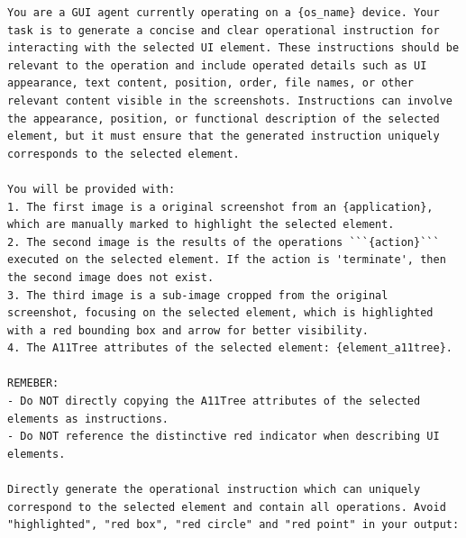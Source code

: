 \begin{tcolorbox}[title=Prompt For Low-Level Instructions in All Trajectories]
\scriptsize
\begin{Verbatim}[breaklines=true, breaksymbol={}]
You are a GUI agent currently operating on a {os_name} device. Your task is to generate a concise and clear operational instruction for interacting with the selected UI element. These instructions should be relevant to the operation and include operated details such as UI appearance, text content, position, order, file names, or other relevant content visible in the screenshots. Instructions can involve the appearance, position, or functional description of the selected element, but it must ensure that the generated instruction uniquely corresponds to the selected element.

You will be provided with:
1. The first image is a original screenshot from an {application}, which are manually marked to highlight the selected element.
2. The second image is the results of the operations ```{action}``` executed on the selected element. If the action is 'terminate', then the second image does not exist.
3. The third image is a sub-image cropped from the original screenshot, focusing on the selected element, which is highlighted with a red bounding box and arrow for better visibility.
4. The A11Tree attributes of the selected element: {element_a11tree}.
                        
REMEBER:
- Do NOT directly copying the A11Tree attributes of the selected elements as instructions.
- Do NOT reference the distinctive red indicator when describing UI elements.

Directly generate the operational instruction which can uniquely correspond to the selected element and contain all operations. Avoid "highlighted", "red box", "red circle" and "red point" in your output:
\end{Verbatim}
\end{tcolorbox}

